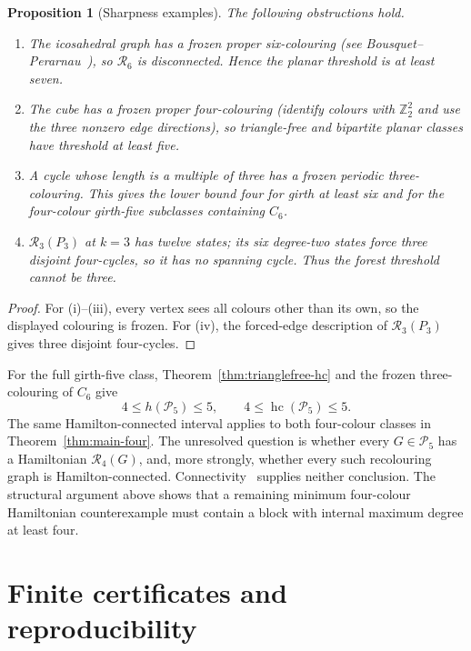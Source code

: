 \documentclass[11pt]{article}
\newtheorem{proposition}[theorem]{Proposition}
\theoremstyle{remark}
\newcommand{\R}{\mathcal R}
\newcommand{\hc}{\operatorname{hc}}
\numberwithin{equation}{section}
\numberwithin{table}{section}
\begin{document}
\begin{proposition}[Sharpness examples]
\label{prop:sharpness}
The following obstructions hold.
\begin{enumerate}[label=(\roman*)]
\item The icosahedral graph has a frozen proper six-colouring (see Bousquet--Perarnau~\cite{BP16}), so $\R_6$ is disconnected.  Hence the planar threshold is at least seven.
\item The cube has a frozen proper four-colouring (identify colours with $\mathbb Z_2^2$ and use the three nonzero edge directions), so triangle-free and bipartite planar classes have threshold at least five.
\item A cycle whose length is a multiple of three has a frozen periodic three-colouring.  This gives the lower bound four for girth at least six and for the four-colour girth-five subclasses containing $C_6$.
\item $\R_3(P_3)$ at $k=3$ has twelve states; its six degree-two states force three disjoint four-cycles, so it has no spanning cycle.  Thus the forest threshold cannot be three.
\end{enumerate}
\end{proposition}

\begin{proof}
For (i)--(iii), every vertex sees all colours other than its own, so the displayed colouring is frozen.  For (iv), the forced-edge description of $\R_3(P_3)$ gives three disjoint four-cycles.
\end{proof}

For the full girth-five class, Theorem~\ref{thm:trianglefree-hc} and
the frozen three-colouring of $C_6$ give
\[
 4\le h(\mathcal P_5)\le5,\qquad
 4\le\hc(\mathcal P_5)\le5.
\]
The same Hamilton-connected interval applies to both four-colour
classes in Theorem~\ref{thm:main-four}. The unresolved question is
whether every $G\in\mathcal P_5$ has a Hamiltonian $\R_4(G)$, and,
more strongly, whether every such recolouring graph is
Hamilton-connected. Connectivity~\cite{BBFHMP23} supplies neither
conclusion. The structural argument above shows that a remaining
minimum four-colour Hamiltonian counterexample must contain a block
with internal maximum degree at least four.

\section{Finite certificates and reproducibility}
\label{sec:verification}
\end{document}
